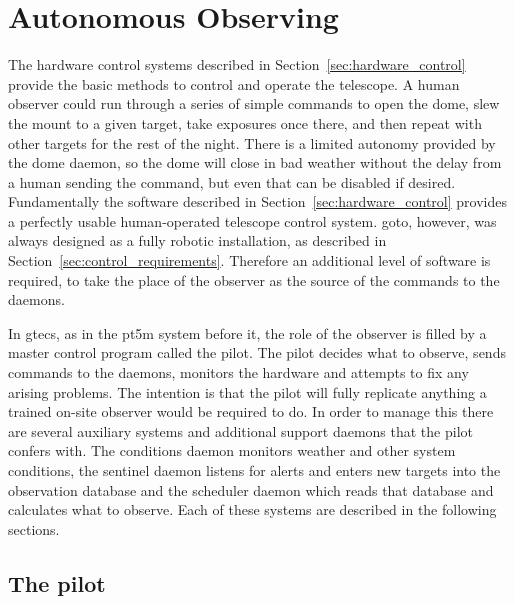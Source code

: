 
\newpage
\section{Autonomous Observing}
\label{sec:autonomous}
\begin{colsection}


\begin{colsection}

The hardware control systems described in Section~\ref{sec:hardware_control} provide the basic methods to control and operate the telescope. A human observer could run through a series of simple commands to open the dome, slew the mount to a given target, take exposures once there, and then repeat with other targets for the rest of the night. There is a limited autonomy provided by the dome daemon, so the dome will close in bad weather without the delay from a human sending the command, but even that can be disabled if desired. Fundamentally the software described in Section~\ref{sec:hardware_control} provides a perfectly usable human-operated telescope control system. \gls{goto}, however, was always designed as a fully robotic installation, as described in Section~\ref{sec:control_requirements}. Therefore an additional level of software is required, to take the place of the observer as the source of the commands to the daemons.

In \gls{gtecs}, as in the \gls{pt5m} system before it, the role of the observer is filled by a master control program called the pilot. The pilot decides what to observe, sends commands to the daemons, monitors the hardware and attempts to fix any arising problems. The intention is that the pilot will fully replicate anything a trained on-site observer would be required to do. In order to manage this there are several auxiliary systems and additional support daemons that the pilot confers with. The conditions daemon monitors weather and other system conditions, the sentinel daemon listens for alerts and enters new targets into the observation database and the scheduler daemon which reads that database and calculates what to observe. Each of these systems are described in the following sections.

\end{colsection}


\subsection{The pilot}
\label{sec:pilot}
\begin{colsection}


\end{colsection}
\end{colsection}
